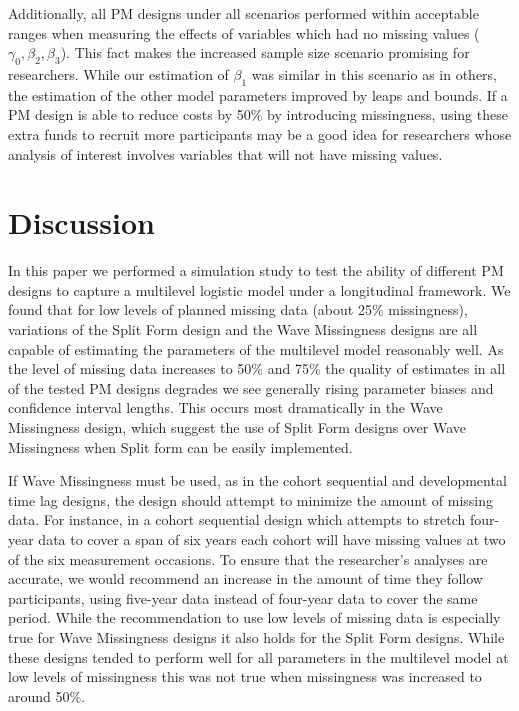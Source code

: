 \documentclass{svjour3}\usepackage[]{graphicx}\usepackage[]{color}
\begin{document}
Additionally, all PM designs under all scenarios performed within acceptable ranges when measuring the effects of variables which had no missing values ($\gamma_0, \beta_2, \beta_3$). This fact makes the increased sample size scenario promising for researchers. While our estimation of $\beta_1$ was similar in this scenario as in others, the estimation of the other model parameters improved by leaps and bounds. If a PM design is able to reduce costs by 50\% by introducing missingness, using these extra funds to recruit more participants may be a good idea for researchers whose analysis of interest involves variables that will not have missing values. \par

\section{Discussion}
\label{4}
In this paper we performed a simulation study to test the ability of different PM designs to capture a multilevel logistic model under a longitudinal framework. We found that for low levels of planned missing data (about 25\% missingness), variations of the Split Form design and the Wave Missingness designs are all capable of estimating the parameters of the multilevel model reasonably well. As the level of missing data increases to 50\% and 75\% the quality of estimates in all of the tested PM designs degrades we see generally rising parameter biases and confidence interval lengths. This occurs most dramatically in the Wave Missingness design, which suggest the use of Split Form designs over Wave Missingness when Split form can be easily implemented.  \par

If Wave Missingness must be used, as in the cohort sequential and developmental time lag designs, the design should attempt to minimize the amount of missing data. For instance, in a cohort sequential design which attempts to stretch four-year data to cover a span of six years each cohort will have missing values at two of the six measurement occasions.  To ensure that the researcher's analyses are accurate, we would recommend an increase in the amount of time they follow participants, using five-year data instead of four-year data to cover the same period. While the recommendation to use low levels of missing data is especially true for Wave Missingness designs it also holds for the Split Form designs. While these designs tended to perform well for all parameters in the multilevel model at low levels of missingness this was not true when missingness was increased to around 50\%. \par
\end{document}
